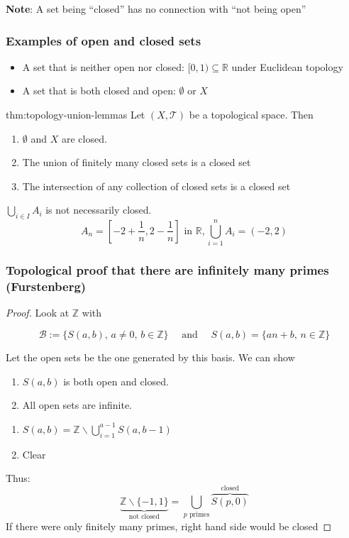 \documentclass{article}
\begin{document}
\textbf{Note}: A set being ``closed'' has no connection with ``not being open''

\subsubsection{Examples of open and closed sets}
\begin{itemize}
    \item A set that is neither open nor closed: $[0, 1) \subseteq \mathbb{R}$ under Euclidean topology
    \item A set that is both closed and open: $\emptyset$ or $X$
\end{itemize}

\begin{thm}[]{thm:topology-union-lemmas}{}
    Let $(X, \mathcal{T})$ be a topological space. Then
    \begin{enumerate}
        \item $\emptyset$ and $X$ are closed.
        \item The union of finitely many closed sets is a closed set
        \item The intersection of any collection of closed sets is a closed set
    \end{enumerate}
\end{thm}

$\bigcup_{i\in I} A_{i}$ is not necessarily closed.
\[A_{n} = \left[-2 + \frac{1}{n}, 2 - \frac{1}{n}\right] \text{ in } \mathbb{R}, \bigcup_{i = 1}^{n} A_{i} = (-2, 2)\]

\subsubsection{Topological proof that there are infinitely many primes (Furstenberg)}
\begin{proof}
    Look at $\mathbb{Z}$ with

    \[\mathcal{B} := \{S(a, b),\, a\ne 0,\,b\in \mathbb{Z}\} \quad\text{ and }\quad S(a,b) = \{an + b,\,n\in \mathbb{Z}\}\]

    Let the open sets be the one generated by this basis. We can show
    \begin{enumerate}
        \item $S(a,b)$ is both open and closed.
        \item All open sets are infinite.
    \end{enumerate}

    \longrule{0.08ex}

    \begin{enumerate}
        \item $S(a,b) = \mathbb{Z} \backslash \bigcup_{i=1}^{a - 1} S(a, b-1)$
        \item Clear
    \end{enumerate}

    Thus:
    \[\underbrace{\mathbb{Z} \backslash \{-1, 1\}}_{\text{not closed}} = \bigcup_{\text{$p$ primes}} \overbrace{S(p, 0)}^{\text{closed}}\]
    If there were only finitely many primes, right hand side would be closed
\end{proof}
\end{document}
